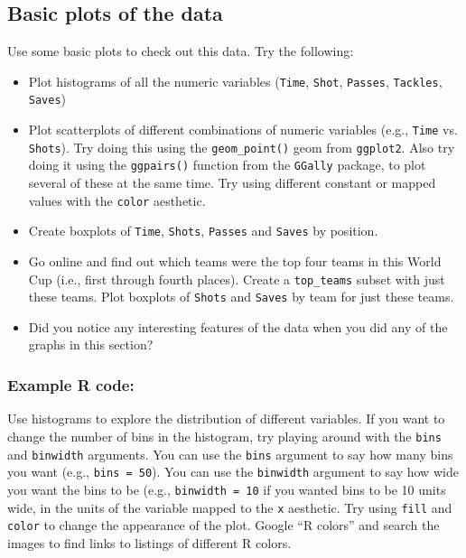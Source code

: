 \documentclass[]{book}
\providecommand{\tightlist}{%
  \setlength{\itemsep}{0pt}\setlength{\parskip}{0pt}}
\theoremstyle{definition}
\theoremstyle{definition}
\theoremstyle{definition}
\theoremstyle{remark}
\begin{document}
\subsection{Basic plots of the data}\label{basic-plots-of-the-data}

Use some basic plots to check out this data. Try the following:

\begin{itemize}
\tightlist
\item
  Plot histograms of all the numeric variables (\texttt{Time},
  \texttt{Shot}, \texttt{Passes}, \texttt{Tackles}, \texttt{Saves})
\item
  Plot scatterplots of different combinations of numeric variables
  (e.g., \texttt{Time} vs. \texttt{Shots}). Try doing this using the
  \texttt{geom\_point()} geom from \texttt{ggplot2}. Also try doing it
  using the \texttt{ggpairs()} function from the \texttt{GGally}
  package, to plot several of these at the same time. Try using
  different constant or mapped values with the \texttt{color} aesthetic.
\item
  Create boxplots of \texttt{Time}, \texttt{Shots}, \texttt{Passes} and
  \texttt{Saves} by position.
\item
  Go online and find out which teams were the top four teams in this
  World Cup (i.e., first through fourth places). Create a
  \texttt{top\_teams} subset with just these teams. Plot boxplots of
  \texttt{Shots} and \texttt{Saves} by team for just these teams.
\item
  Did you notice any interesting features of the data when you did any
  of the graphs in this section?
\end{itemize}

\subsubsection{Example R code:}\label{example-r-code-1}

Use histograms to explore the distribution of different variables. If
you want to change the number of bins in the histogram, try playing
around with the \texttt{bins} and \texttt{binwidth} arguments. You can
use the \texttt{bins} argument to say how many bins you want (e.g.,
\texttt{bins\ =\ 50}). You can use the \texttt{binwidth} argument to say
how wide you want the bins to be (e.g., \texttt{binwidth\ =\ 10} if you
wanted bins to be 10 units wide, in the units of the variable mapped to
the \texttt{x} aesthetic. Try using \texttt{fill} and \texttt{color} to
change the appearance of the plot. Google ``R colors'' and search the
images to find links to listings of different R colors.
\end{document}

